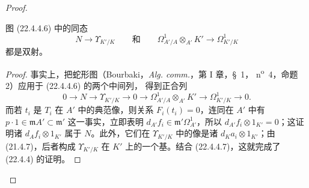 \begin{proof}
\begin{lemma}[22.4.4.7]
\label{0.22.4.4.7-fr}
图 (22.4.4.6) 中的同态
\[
  N\longrightarrow\Upsilon_{K'/K}\qquad\text{和}\qquad
  \Omega^1_{A'/A}\otimes_{A'}K'\longrightarrow\Omega^1_{K'/K}
\]
都是双射。
\end{lemma}

\begin{proof}
事实上，把蛇形图（Bourbaki，\emph{Alg. comm.}，第 I 章，§~1，
n\textsuperscript{o}~4，命题 2）应用于 (22.4.4.6) 的两个中间列，
得到正合列
\[
  0\longrightarrow N\longrightarrow\Upsilon_{K'/K}\longrightarrow0
  \longrightarrow\Omega^1_{A'/A}\otimes_{A'}K'
  \longrightarrow\Omega^1_{K'/K}\longrightarrow0.
\]
而若 $t_i$ 是 $T_i$ 在 $A'$ 中的典范像，则关系
$F_i(t_i)=0$，连同在 $A'$ 中有
$p\cdot1\in\mathfrak mA'\subset\mathfrak m'$ 这一事实，立即表明
$d_{A'}f_i\in\mathfrak m'\Omega^1_{A'}$，所以
$d_{A'}f_i\otimes1_{K'}=0$；这证明诸 $d_Af_i\otimes1_{K'}$ 属于
$N$。此外，它们在 $\Upsilon_{K'/K}$ 中的像是诸
$d_Ka_i\otimes1_{K'}$；由 (21.4.7)，后者构成 $\Upsilon_{K'/K}$ 在
$K'$ 上的一个基。结合 (22.4.4.7)，这就完成了 (22.4.4) 的证明。
\end{proof}
\end{proof}

